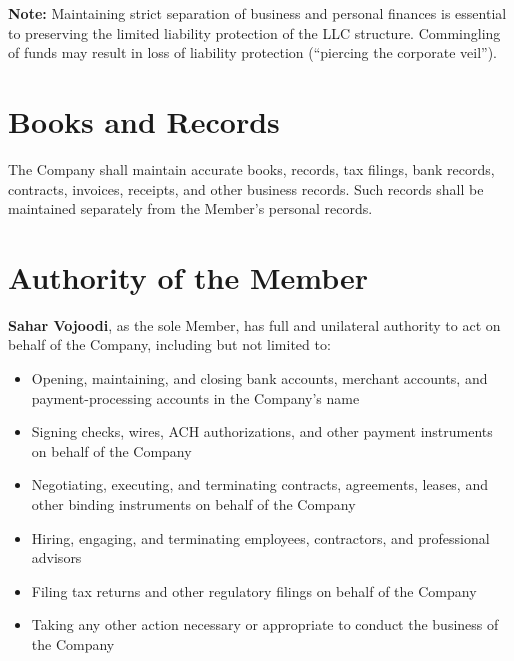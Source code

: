 \documentclass{toospoint}
\begin{document}
\begin{clausebox}
\sffamily\footnotesize\color{TPGray}
\textbf{Note:} Maintaining strict separation of business and personal
finances is essential to preserving the limited liability protection of
the LLC structure. Commingling of funds may result in loss of liability
protection (``piercing the corporate veil'').
\end{clausebox}

\section{Books and Records}

The Company shall maintain accurate books, records, tax filings, bank
records, contracts, invoices, receipts, and other business records. Such
records shall be maintained separately from the Member's personal records.

\section{Authority of the Member}

\textbf{Sahar Vojoodi}, as the sole Member, has full and unilateral
authority to act on behalf of the Company, including but not limited to:

\begin{itemize}[leftmargin=1.5em, itemsep=4pt, topsep=4pt]
  \item Opening, maintaining, and closing bank accounts, merchant accounts,
        and payment-processing accounts in the Company's name
  \item Signing checks, wires, ACH authorizations, and other payment
        instruments on behalf of the Company
  \item Negotiating, executing, and terminating contracts, agreements,
        leases, and other binding instruments on behalf of the Company
  \item Hiring, engaging, and terminating employees, contractors, and
        professional advisors
  \item Filing tax returns and other regulatory filings on behalf of
        the Company
  \item Taking any other action necessary or appropriate to conduct the
        business of the Company
\end{itemize}
\end{document}
